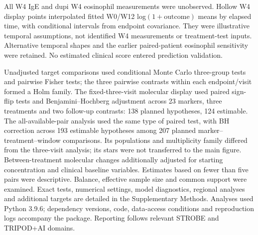 All W4 IgE and dupi W4 eosinophil measurements were unobserved. Hollow W4 display points interpolated fitted W0/W12 log$(1+\mathrm{outcome})$ means by elapsed time, with conditional intervals from endpoint covariance. They were illustrative temporal assumptions, not identified W4 measurements or treatment-test inputs. Alternative temporal shapes and the earlier paired-patient eosinophil sensitivity were retained. No estimated clinical score entered prediction validation.

Unadjusted target comparisons used conditional Monte Carlo three-group tests and pairwise Fisher tests; the three pairwise contrasts within each endpoint/visit formed a Holm family. The fixed-three-visit molecular display used paired sign-flip tests and Benjamini--Hochberg adjustment across 23 markers, three treatments and two follow-up contrasts: 138 planned hypotheses, 124 estimable. The all-available-pair analysis used the same type of paired test, with BH correction across 193 estimable hypotheses among 207 planned marker--treatment--window comparisons. Its populations and multiplicity family differed from the three-visit analysis; its stars were not transferred to the main figure. Between-treatment molecular changes additionally adjusted for starting concentration and clinical baseline variables. Estimates based on fewer than five pairs were descriptive. Balance, effective sample size and common support were examined. Exact tests, numerical settings, model diagnostics, regional analyses and additional targets are detailed in the Supplementary Methods. Analyses used Python 3.9.6; dependency versions, code, data-access conditions and reproduction logs accompany the package. Reporting follows relevant STROBE and TRIPOD+AI domains.\citep{vonelm2007strobe,collins2024tripod}
